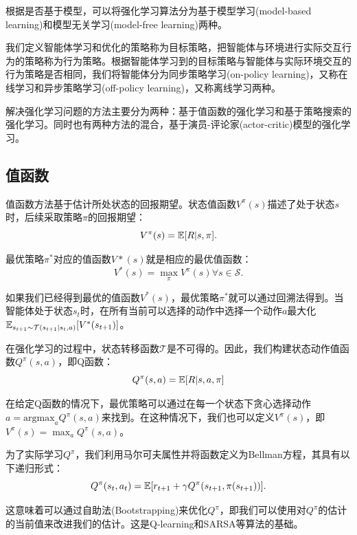根据是否基于模型，可以将强化学习算法分为基于模型学习(model-based learning)和模型无关学习(model-free learning)两种。

我们定义智能体学习和优化的策略称为目标策略，把智能体与环境进行实际交互行为的策略称为行为策略。根据智能体学习到的目标策略与智能体与实际环境交互的行为策略是否相同，我们将智能体分为同步策略学习(on-policy learning)，又称在线学习和异步策略学习(off-policy learning)，又称离线学习两种。

解决强化学习问题的方法主要分为两种：基于值函数的强化学习和基于策略搜索的强化学习。同时也有两种方法的混合，基于演员-评论家(actor-critic)模型的强化学习。

\subsection{值函数}
值函数方法基于估计所处状态的回报期望。状态值函数$V^{\pi}(s)$描述了处于状态$s$时，后续采取策略$\pi$的回报期望：
\begin{equation}
V^{\pi}(s) = \Bbb{E}[R|s,\pi].
\end{equation}

最优策略$\pi^*$对应的值函数$V*(s)$就是相应的最优值函数：
\begin{equation}
V^*(s) = \max_\pi V^{\pi}(s) \forall s \in \mathcal{S}.
\end{equation}

如果我们已经得到最优的值函数$V^*(s)$，最优策略$\pi^*$就可以通过回溯法得到。当智能体处于状态$s_t$时，在所有当前可以选择的动作中选择一个动作$a$最大化$\Bbb{E} _{s_{t+1} \sim \mathcal{T}(s_{t+1}|s_t,a)} [V^*(s_{t+1})]$。

在强化学习的过程中，状态转移函数$\mathcal{T}$是不可得的。因此，我们构建状态动作值函数$Q^\pi (s,a)$，即Q函数：
\begin{equation}
Q^{\pi}(s, a) = \Bbb{E} [R | s, a, \pi]
\end{equation}

在给定Q函数的情况下，最优策略可以通过在每一个状态下贪心选择动作$a = \text{argmax}_a Q^{\pi}(s, a)$来找到。在这种情况下，我们也可以定义$V^{\pi}(s)$，即$V^{\pi}(s) = \max_a Q^\pi (s,a)$。

为了实际学习$Q^\pi$，我们利用马尔可夫属性并将函数定义为Bellman方程，其具有以下递归形式：
\begin{equation}
Q^{\pi}(s_t, a_t) = \Bbb{E} [r_{t+1} + \gamma Q^\pi (s_{t+1}, \pi(s_{t+1}))].
\end{equation}

这意味着可以通过自助法(Bootstrapping)来优化$Q^\pi$，即我们可以使用对$Q^\pi$的估计的当前值来改进我们的估计。这是Q-learning\cite{19}和SARSA\cite{20}等算法的基础。

